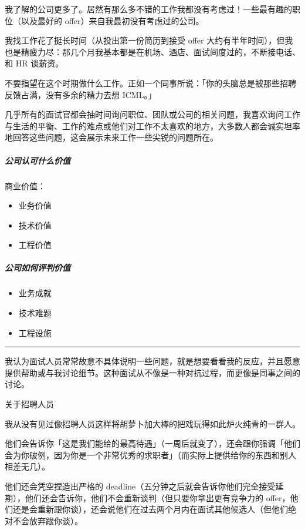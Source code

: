 \documentclass[letterpaper,10pt,english]{sphinxmanual}
\begin{document}
我了解的公司更多了。居然有那么多不错的工作我都没有考虑过！一些最有趣的职位（以及最好的
offer）来自我最初没有考虑过的公司。

我找工作花了挺长时间（从投出第一份简历到接受 offer
大约有半年时间），但我也是精疲力尽：那几个月我基本都是在机场、酒店、面试间度过的，不断接电话、和
HR 谈薪资。

不要指望在这个时期做什么工作。正如一个同事所说：「你的头脑总是被那些招聘反馈占满，没有多余的精力去想
ICML。」

几乎所有的面试官都会抽时间询问职位、团队或公司的相关问题，我喜欢询问工作与生活的平衡、工作的难点或他们对工作不太喜欢的地方，大多数人都会诚实坦率地回答这些问题，这会展示未来工作一些尖锐的问题所在。


\subparagraph{公司认可什么价值}
\label{\detokenize{chapter_interview/offer:id2}}
商业价值：
\begin{itemize}
\item {} 
业务价值

\item {} 
技术价值

\item {} 
工程价值

\end{itemize}


\subparagraph{公司如何评判价值}
\label{\detokenize{chapter_interview/offer:id3}}\begin{itemize}
\item {} 
业务成就

\item {} 
技术难题

\item {} 
工程设施

\end{itemize}


\bigskip\hrule\bigskip


我认为面试人员常常故意不具体说明一些问题，就是想要看看我的反应，并且愿意提供帮助或与我讨论细节。这种面试从不像是一种对抗过程，而更像是同事之间的讨论。

关于招聘人员

我从没有见过像招聘人员这样将胡萝卜加大棒的把戏玩得如此炉火纯青的一群人。

他们会告诉你「这是我们能给的最高待遇」（一周后就变了），还会跟你强调「他们会为你破例，因为你是一个非常优秀的求职者」（而实际上提供给你的东西和别人相差无几）。

他们还会凭空捏造出严格的
deadline（五分钟之后就会告诉你他们完全接受延期），他们还会告诉你，他们不会重新谈判（但只要你拿出更有竞争力的
offer，他们还是会重新跟你谈），还会说他们在过去两个月内在面试其他候选人（但他们绝对不会放弃跟你谈）。
\end{document}
